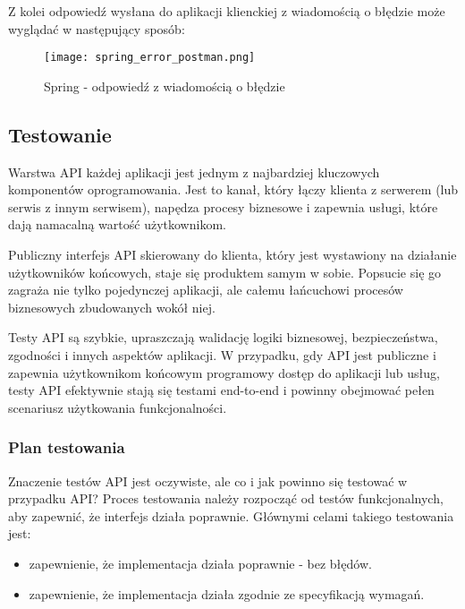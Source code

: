 		\noindent Z kolei odpowiedź wysłana do aplikacji klienckiej z wiadomością o błędzie może wyglądać w następujący sposób:
		\begin{figure}[H]
			\begin{center}
				\texttt{[image: spring\_error\_postman.png]}
				\caption{\label{fig:spring-error-response} Spring - odpowiedź z wiadomością o błędzie}
			\end{center}
		\end{figure}
	
	\subsection{Testowanie}
	Warstwa API każdej aplikacji jest jednym z najbardziej kluczowych komponentów oprogramowania. Jest to kanał, który łączy klienta z serwerem (lub serwis z innym serwisem), napędza procesy biznesowe i zapewnia usługi, które dają namacalną wartość użytkownikom.
	
	Publiczny interfejs API skierowany do klienta, który jest wystawiony na działanie użytkowników końcowych, staje się produktem samym w sobie. Popsucie się go zagraża nie tylko pojedynczej aplikacji, ale całemu łańcuchowi procesów biznesowych zbudowanych wokół niej.
	
	Testy API są szybkie, upraszczają walidację logiki biznesowej, bezpieczeństwa, zgodności i innych aspektów aplikacji. W przypadku, gdy API jest publiczne i zapewnia użytkownikom końcowym programowy dostęp do aplikacji lub usług, testy API efektywnie stają się testami end-to-end i powinny obejmować pełen scenariusz użytkowania funkcjonalności.
	
	\subsubsection{Plan testowania}
	Znaczenie testów API jest oczywiste, ale co i jak powinno się testować w przypadku API? Proces testowania należy rozpocząć od testów funkcjonalnych, aby zapewnić, że interfejs działa poprawnie. Głównymi celami takiego testowania jest:
	\begin{itemize}
		\item zapewnienie, że implementacja działa poprawnie - bez błędów.
		\item zapewnienie, że implementacja działa zgodnie ze specyfikacją wymagań.
	\end{itemize}
	
